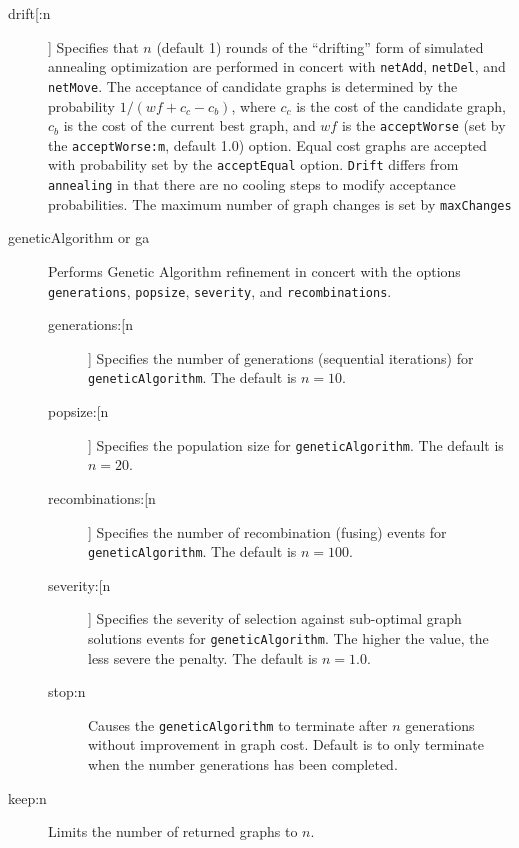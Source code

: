 \begin{description}
			
		\item[drift[:n]] Specifies that $n$ (default 1) rounds of the ``drifting'' form of simulated annealing 
		\citep{goloboff1999} optimization are performed in concert with \texttt{netAdd}, 	\texttt{netDel}, 
		and \texttt{netMove}. The acceptance of candidate graphs is determined by the probability 
		$1/ (wf + c_c - c_b)$, where $c_c$ is the cost of the candidate graph, $c_b$ is the cost of the 
		current best graph, and $wf$ is the \texttt{acceptWorse} (set by the \texttt{acceptWorse:m}, 
		default 1.0) option. Equal cost graphs are accepted with probability set by the \texttt{acceptEqual} 
		option. \texttt{Drift} differs from \texttt{annealing} in that there are no cooling steps to modify 
		acceptance probabilities. The maximum number of graph changes is set by \texttt{maxChanges}
			
					
		\item[geneticAlgorithm or ga] Performs Genetic Algorithm \citep{Holland1975} refinement in 
		concert with the options \texttt{generations}, \texttt{popsize}, \texttt{severity}, and 
		\texttt{recombinations}. 
			
			\begin{description}
		
			\item[generations:[n]] Specifies the number of generations (sequential iterations) for 
			\texttt{geneticAlgorithm}. The default is $n=10$.

			\item[popsize:[n]] Specifies the population size for \texttt{geneticAlgorithm}. The default is 
			$n=20$.
			
			\item[recombinations:[n]] Specifies the number of recombination (fusing) events for 
			\texttt{geneticAlgorithm}. The default is $n=100$.
			
			\item[severity:[n]] Specifies the severity of selection against sub-optimal graph solutions 
			events for \texttt{geneticAlgorithm}. The higher the value, the less severe the penalty. The 
			default is $n=1.0$.
			
			\item[stop:n] Causes the \texttt{geneticAlgorithm} to terminate after $n$ generations without 
			improvement in graph cost.  Default is to only terminate when the number generations has 
			been completed.

			\end{description}
		
		\item[keep:n] Limits the number of returned graphs to $n$. 
		
		\end{description}
	
